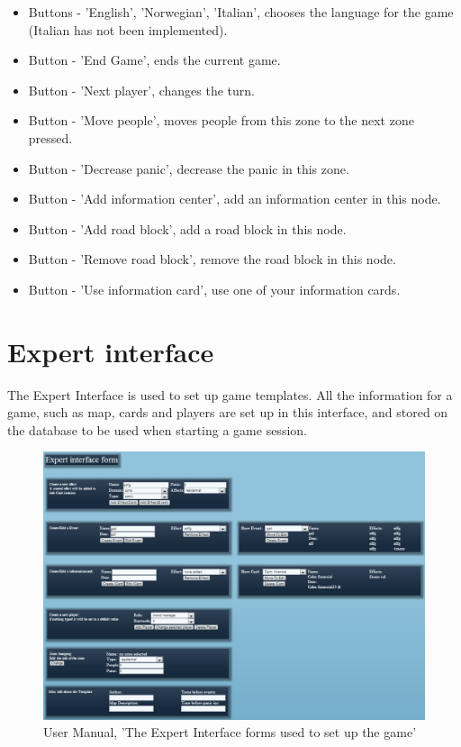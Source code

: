 \begin{itemize}
\item Buttons - 'English', 'Norwegian', 'Italian', chooses the language for the game (Italian has not been implemented).
\item Button - 'End Game', ends the current game.
\item Button - 'Next player', changes the turn.
\item Button - 'Move people', moves people from this zone to the next zone pressed.
\item Button - 'Decrease panic', decrease the panic in this zone.
\item Button - 'Add information center', add an information center in this node.
\item Button - 'Add road block', add a road block in this node.
\item Button - 'Remove road block', remove the road block in this node.
\item Button - 'Use information card', use one of your information cards.
\end{itemize}

\section{Expert interface}

The Expert Interface is used to set up game templates. All the information for a game, such as map, cards and players are set up in this interface, and stored on the database to be used when starting a game session.

\begin{figure}[H]
  \centering
    \includegraphics[width=1.0\textwidth]{img/ExpertInterfaceForms.png}
  \caption{User Manual, 'The Expert Interface forms used to set up the game'}
  \label{fig:expertinterface}
\end{figure}

